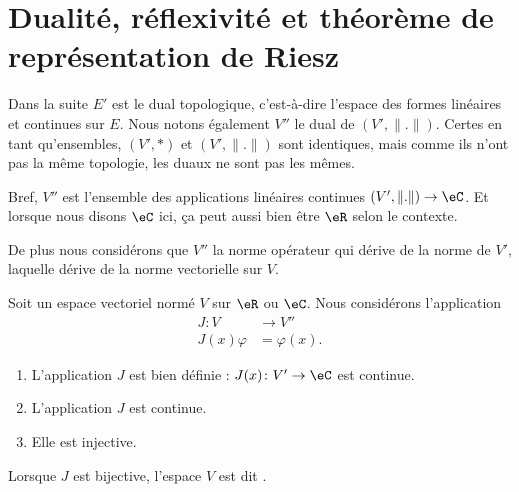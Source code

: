 \section{Dualité, réflexivité et théorème de représentation de Riesz}

Dans la suite \( E'\) est le dual topologique, c'est-à-dire l'espace des formes linéaires et continues sur \( E\). Nous notons également \( V''\) le dual de \( (V',\| . \|)\). Certes en tant qu'ensembles, \( (V',*)\) et \( (V',\| . \|) \) sont identiques, mais comme ils n'ont pas la même topologie, les duaux ne sont pas les mêmes.

Bref, \( V''\) est l'ensemble des applications linéaires continues \( (V',\| . \|)\to \eC\). Et lorsque nous disons \( \eC\) ici, ça peut aussi bien être \( \eR\) selon le contexte.

De plus nous considérons que \( V''\) la norme opérateur qui dérive de la norme de \( V'\), laquelle dérive de la norme vectorielle sur \( V\).

\begin{propositionDef}      \label{PROPooMAQSooCGFBBM}
	Soit un espace vectoriel normé \( V\) sur \( \eR\) ou \( \eC\). Nous considérons l'application
	\begin{equation}
		\begin{aligned}
			J\colon V   & \to V''       \\
			J(x)\varphi & = \varphi(x).
		\end{aligned}
	\end{equation}
	\begin{enumerate}
		\item       \label{ITEMooNVVSooNFXgnE}
		      L'application \( J\) est bien définie : \( J(x)\colon V'\to \eC\) est continue.
		\item       \label{ITEMooKURHooZZWpbu}
		      L'application \( J\) est continue.
		\item       \label{ITEMooTFYVooKhMOjp}
		      Elle est injective.
	\end{enumerate}

	Lorsque \( J\) est bijective, l'espace \( V\) est dit .
\end{propositionDef}

